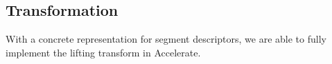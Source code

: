 %
%

%


\subsection{Transformation}
With a concrete representation for segment descriptors, we are able to fully implement the lifting transform in Accelerate.

